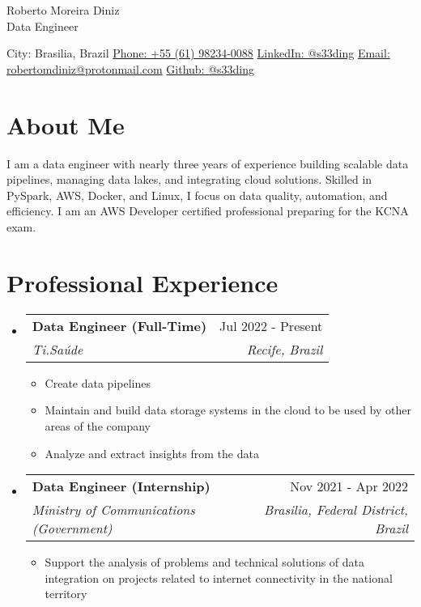 \documentclass[letterpaper,11pt]{article}%
\makeatletter
\newcommand{\resumeItem}[1]{\item{#1 \vspace{-3pt}}}%
\newcommand{\resumeSubheading}[4]{\vspace{-1pt}\item\begin{tabular*}{0.97\textwidth}[t]{l@{\extracolsep{\fill}}r}\textbf{#1} & #2 \\\textit{\small #3} & \textit{\small #4} \\\end{tabular*}\vspace{-8pt}}%
\newcommand{\resumeSubHeadingListStart}{\begin{itemize}[leftmargin=0.15in, label={}, itemsep=0pt, parsep=0pt]}%
\newcommand{\resumeSubHeadingListEnd}{\end{itemize}}%
\newcommand{\resumeItemListStart}{\begin{itemize}[itemsep=0pt, parsep=0pt]}%
\newcommand{\resumeItemListEnd}{\end{itemize}\vspace{-1pt}}%
\makeatother
\begin{document}
%
\normalsize%
\section*{}%
\label{sec:}%
\begin{center}%
{\LARGE Roberto Moreira Diniz} \\ \vspace{5pt}%
{\large Data Engineer} \\ \vspace{5pt}%
\end{center}%
\begin{center}%
City: Brasilia, Brazil \quad \textbullet \quad \href{https://wa.me/qr/UYOUX2DZ7BYHI1}{Phone: +55 (61) 98234-0088} \quad \textbullet \quad \href{https://www.linkedin.com/in/s33ding/}{LinkedIn: @s33ding} \quad \textbullet \quad \href{mailto:robertomdiniz@protonmail.com}{Email: robertomdiniz@protonmail.com} \quad \textbullet \quad \href{https://github.com/s33ding}{Github: @s33ding}%
\end{center}

%
\section*{About Me}%
\label{sec:AboutMe}%
I am a data engineer with nearly three years of experience building scalable data pipelines, managing data lakes, and integrating cloud solutions. Skilled in PySpark, AWS, Docker, and Linux, I focus on data quality, automation, and efficiency. I am an AWS Developer certified professional preparing for the KCNA exam.

%
\section*{Professional Experience}%
\label{sec:ProfessionalExperience}%
\resumeSubHeadingListStart%
\resumeSubheading{Data Engineer (Full-Time)}{Jul 2022 - Present}{Ti.Saúde}{Recife, Brazil}%
\resumeItemListStart%
\resumeItem{Create data pipelines}%
\resumeItem{Maintain and build data storage systems in the cloud to be used by other areas of the company}%
\resumeItem{Analyze and extract insights from the data}%
\resumeItemListEnd%
\resumeSubheading{Data Engineer (Internship)}{Nov 2021 - Apr 2022}{Ministry of Communications (Government)}{Brasilia, Federal District, Brazil}%
\resumeItemListStart%
\resumeItem{Support the analysis of problems and technical solutions of data integration on projects related to internet connectivity in the national territory}%
\resumeItemListEnd%
\resumeSubHeadingListEnd
\end{document}

